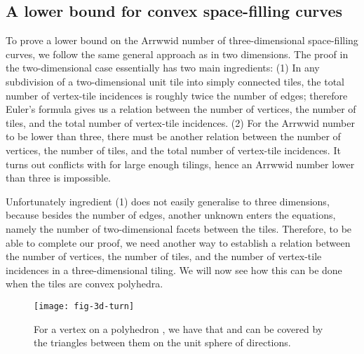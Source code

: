 \documentclass[11pt,a4paper]{article}
\begin{document}
\subsection{A lower bound for convex space-filling curves}

To prove a lower bound on the Arrwwid number of three-dimensional space-filling curves, we follow the same general approach as in two dimensions. The proof in the two-dimensional case essentially has two main ingredients: (1) In any subdivision of a two-dimensional unit tile into simply connected tiles, the total number of vertex-tile incidences is roughly twice the number of edges; therefore Euler's formula gives us a relation  between the number of vertices, the number of tiles, and the total number of vertex-tile incidences. (2) For the Arrwwid number to be lower than three, there must be another relation  between the number of vertices, the number of tiles, and the total number of vertex-tile incidences. It turns out  conflicts with  for large enough tilings, hence an Arrwwid number lower than three is impossible.

Unfortunately ingredient (1) does not easily generalise to three dimensions, because besides the number of edges, another unknown enters the equations, namely the number of two-dimensional facets between the tiles. Therefore, to be able to complete our proof, we need another way to establish a relation between the number of vertices, the number of tiles, and the number of vertex-tile incidences in a three-dimensional tiling. We will now see how this can be done when the tiles are convex polyhedra.

\begin{figure}
\centering
\texttt{[image: fig-3d-turn]}
\caption{For a vertex  on a polyhedron , we have that  and  can be covered by the triangles between them on the unit sphere of directions.}
\label{fig:3d-turn}
\end{figure}
\end{document}
